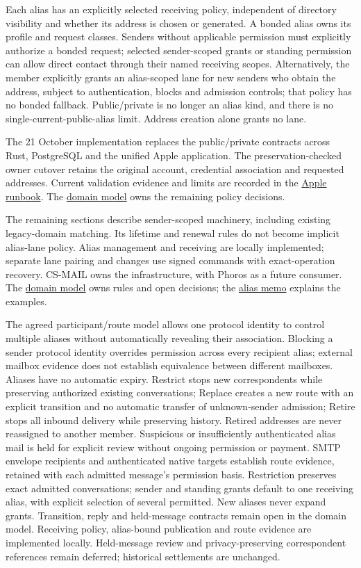 \documentclass[11pt]{article}
\begin{document}
Each alias has an explicitly selected receiving policy, independent of directory
visibility and whether its address is chosen or generated. A bonded alias owns its
profile and request classes. Senders without applicable permission must explicitly
authorize a bonded request; selected sender-scoped grants or standing permission
can allow direct contact through their named receiving scopes. Alternatively,
the member explicitly grants an alias-scoped lane for new senders who obtain the
address, subject to authentication, blocks and admission controls; that policy has
no bonded fallback. Public/private is no longer an alias kind, and there is no
single-current-public-alias limit. Address creation alone grants no lane.

The 21 October implementation replaces the public/private contracts across Rust,
PostgreSQL and the unified Apple application. The preservation-checked owner
cutover retains the original account, credential association and requested
addresses. Current validation evidence and limits are recorded in the
\href{apps/cs-mail-apple/README.md}{Apple runbook}. The
\href{DOMAIN_MODEL.md}{domain model} owns the remaining policy decisions.

The remaining sections describe sender-scoped machinery, including existing
legacy-domain matching. Its lifetime and renewal rules do not become implicit
alias-lane policy. Alias management and receiving are locally implemented;
separate lane pairing and changes use signed commands with exact-operation recovery. CS-MAIL owns the
infrastructure, with Phoros as a future consumer. The
\href{DOMAIN_MODEL.md}{domain model} owns rules and open decisions; the
\href{cs_mail_aliases_and_express_lanes.tex}{alias memo} explains the examples.

The agreed participant/route model allows one protocol identity to control
multiple aliases without automatically revealing their association. Blocking a
sender protocol identity overrides permission across every recipient alias;
external mailbox evidence does not establish equivalence between different
mailboxes. Aliases have no automatic expiry. Restrict stops new
correspondents while preserving authorized existing conversations; Replace creates
a new route with an explicit transition and no automatic transfer of unknown-sender
admission; Retire stops all inbound delivery while preserving history. Retired
addresses are never reassigned to another member. Suspicious or insufficiently
authenticated alias mail is held for explicit review without ongoing
permission or payment. SMTP envelope recipients and authenticated native targets
establish route evidence, retained with each admitted message's permission basis.
Restriction preserves exact admitted conversations; sender and standing grants
default to one receiving alias, with explicit selection of several permitted.
New aliases never expand grants. Transition, reply and held-message contracts
remain open in the domain model. Receiving policy, alias-bound publication and route evidence are implemented locally.
Held-message review and privacy-preserving correspondent references remain deferred;
historical settlements are unchanged.
\end{document}
